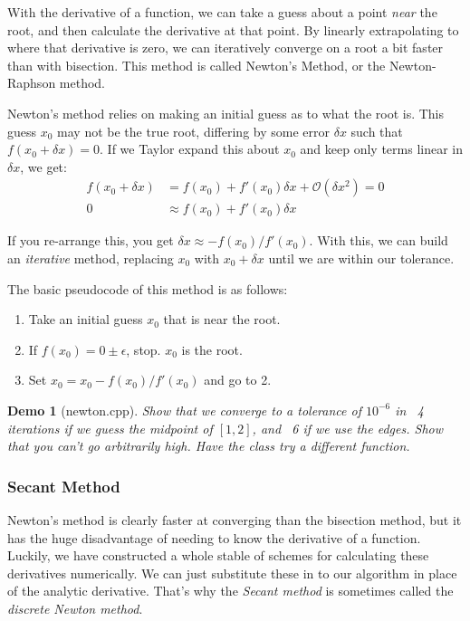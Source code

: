 \documentclass{article}
\theoremstyle{demo}
\newtheorem{demo}{Demo}[section]
\begin{document}
With the derivative of a function, we can take a guess about a point
\textit{near} the root, and then calculate the derivative at that point.  By
linearly extrapolating to where that derivative is zero, we can iteratively
converge on a root a bit faster than with bisection. This method is called
Newton's Method, or the Newton-Raphson method.

Newton's method relies on making an initial guess as to what the root is.  This
guess $x_0$ may not be the true root, differing by some error $\delta x$ such
that $f(x_0+\delta x) = 0$.  If we Taylor expand this about $x_0$ and keep only
terms linear in $\delta x$, we get:
\begin{equation}
    \begin{aligned}
        f(x_0 + \delta x) & = f(x_0) + f'(x_0)\delta x + \mathcal{O}(\delta x^2) = 0\\
        0 &\approx f(x_0) + f'(x_0)\delta x
    \end{aligned}
\end{equation}

If you re-arrange this, you get $\delta x \approx -f(x_0)/f'(x_0)$.  With this,
we can build an \textit{iterative} method, replacing $x_0$ with $x_0 + \delta x$
until we are within our tolerance.

The basic pseudocode of this method is as follows:
\begin{enumerate}
    \item Take an initial guess $x_0$ that is near the root.
    \item If $f(x_0) = 0 \pm \epsilon$, stop.  $x_0$ is the root.
    \item Set $x_0 = x_0 - f(x_0)/f'(x_0)$ and go to 2.
\end{enumerate}

\begin{demo}[newton.cpp]
    Show that we converge to a tolerance of $10^{-6}$ in ~4 iterations if we
    guess the midpoint of $[1,2]$, and ~6 if we use the edges.  Show that you
    can't go arbitrarily high.  Have the class try a different function.
\end{demo}

\subsubsection{Secant Method}
Newton's method is clearly faster at converging than the bisection method, but
it has the huge disadvantage of needing to know the derivative of a function.
Luckily, we have constructed a whole stable of schemes for calculating these
derivatives numerically.  We can just substitute these in to our algorithm in
place of the analytic derivative.  That's why the \textit{Secant method} is
sometimes called the \textit{discrete Newton method}.  
\end{document}
